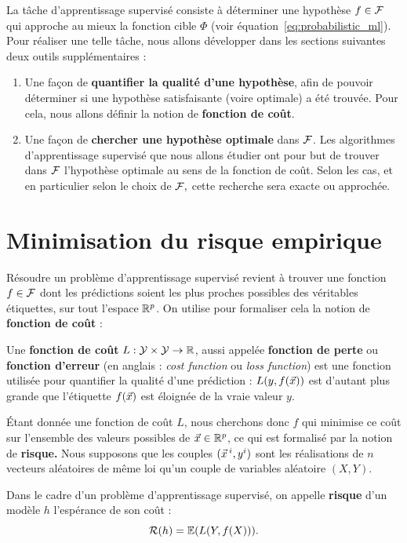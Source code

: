 La tâche d'apprentissage supervisé consiste à déterminer une hypothèse
$f \in \mathcal{F}$ qui approche au mieux la fonction cible $\Phi$ (voir
équation~\eqref{eq:probabilistic_ml}). Pour réaliser une telle tâche, nous
allons développer dans les sections suivantes deux outils supplémentaires :
\begin{enumerate}
\item Une façon de \textbf{quantifier la qualité d'une hypothèse}, afin de
  pouvoir déterminer si une hypothèse satisfaisante (voire optimale) a été
  trouvée.  Pour cela, nous allons définir la notion de \textbf{fonction de
    coût}.
\item Une façon de \textbf{chercher une hypothèse optimale} dans $\mathcal{F}$.  Les
  algorithmes d'apprentissage supervisé que nous allons étudier ont pour but de
  trouver dans $\mathcal{F}$ l'hypothèse optimale au sens de la fonction de coût. Selon
  les cas, et en particulier selon le choix de $\mathcal{F},$ cette recherche sera
  exacte ou approchée.
\end{enumerate}

\section{Minimisation du risque empirique}
\label{sec:mre}
Résoudre un problème d'apprentissage supervisé revient à trouver une fonction
$f \in \mathcal{F}$ dont les prédictions soient les plus proches possibles des
véritables étiquettes, sur tout l'espace $\mathbb{R}^p$. On utilise pour formaliser cela
la notion de \textbf{fonction de coût} :

Une \textbf{fonction de coût} $L: \mathcal{Y} \times \mathcal{Y} \to \mathbb{R}$, 
aussi appelée \textbf{fonction de perte} ou \textbf{fonction d'erreur}
(en anglais : {\it cost function} ou {\it loss function})
est une fonction utilisée pour quantifier la qualité d'une prédiction : 
$L(y, f(\xx))$ est d'autant plus grande que l'étiquette $f(\xx)$ est éloignée de
la vraie valeur $y$.

Étant donnée une fonction de coût $L$, nous cherchons donc $f$ qui minimise ce
coût sur l'ensemble des valeurs possibles de $\xx \in \RR^p$, ce qui est
formalisé par la notion de \textbf{risque.} Nous supposons que les couples
$(\xx^i, y^i)$ sont les réalisations de $n$ vecteurs aléatoires de même loi
qu'un couple de variables aléatoire $(X, Y).$

Dans le cadre d'un problème d'apprentissage supervisé, on appelle
\textbf{risque} d'un modèle $h$ l'espérance de son coût :
\begin{equation}
  \label{eq:risque}
  \mathcal{R}(h) = \mathbb{E}(L(Y, f(X))).
\end{equation}


